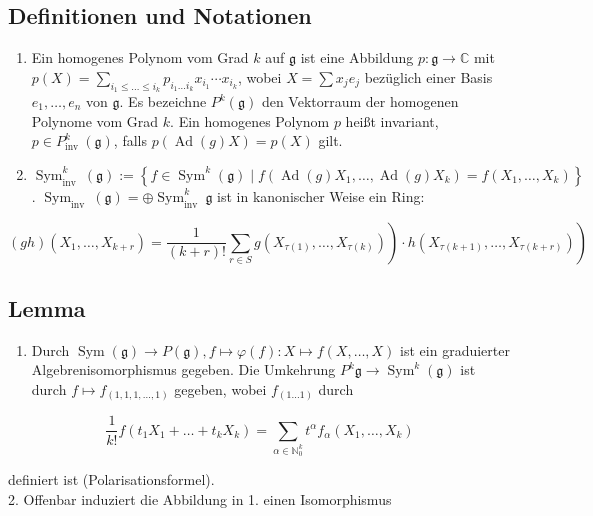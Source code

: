 \documentclass[10pt, letterpaper]{article}
\begin{document}
\subsection*{Definitionen und Notationen}
\begin{enumerate}
  \item Ein homogenes Polynom vom Grad $k$ auf $\mathfrak{g}$ ist eine Abbildung $p: \mathfrak{g} \rightarrow \mathbb{C}$ mit $p(X)=\sum_{i_{1} \leq \ldots \leq i_{k}} p_{i_{1} \ldots i_{k}} x_{i_{1}} \cdots x_{i_{k}}$, wobei $X=\sum x_{j} e_{j}$ bezüglich einer Basis $e_{1}, \ldots, e_{n}$ von $\mathfrak{g}$. Es bezeichne $P^{k}(\mathfrak{g})$ den Vektorraum der homogenen Polynome vom Grad $k$. Ein homogenes Polynom $p$ heißt invariant, $p \in P_{\text {inv }}^{k}(\mathfrak{g})$, falls $p(\operatorname{Ad}(g) X)=p(X)$ gilt.
  \item $\operatorname{Sym}_{\text {inv }}^{k}(\mathfrak{g}):=\left\{f \in \operatorname{Sym}^{k}(\mathfrak{g}) \mid f\left(\operatorname{Ad}(g) X_{1}, \ldots, \operatorname{Ad}(g) X_{k}\right)=f\left(X_{1}, \ldots, X_{k}\right)\right\}$. $\operatorname{Sym}_{\text {inv }}(\mathfrak{g})=\oplus \operatorname{Sym}_{\text {inv }}^{k} \mathfrak{g}$ ist in kanonischer Weise ein Ring:
\end{enumerate}

$$
\left.\left.(g h)\left(X_{1}, \ldots, X_{k+r}\right)=\frac{1}{(k+r)!} \sum_{r \in S} g\left(X_{\tau(1)}, \ldots, X_{\tau(k)}\right)\right) \cdot h\left(X_{\tau(k+1)}, \ldots, X_{\tau(k+r)}\right)\right)
$$

\subsection*{Lemma}
\begin{enumerate}
  \item Durch $\operatorname{Sym}(\mathfrak{g}) \rightarrow P(\mathfrak{g}), f \mapsto \varphi(f): X \mapsto f(X, \ldots, X)$ ist ein graduierter Algebrenisomorphismus gegeben. Die Umkehrung $P^{k} \mathfrak{g} \rightarrow \operatorname{Sym}^{k}(\mathfrak{g})$ ist durch $f \mapsto f_{(1,1,1, \ldots, 1)}$ gegeben, wobei $f_{(1 \ldots 1)}$ durch
\end{enumerate}

$$
\frac{1}{k!} f\left(t_{1} X_{1}+\ldots+t_{k} X_{k}\right)=\sum_{\alpha \in \mathbb{N}_{0}^{k}} t^{\alpha} f_{\alpha}\left(X_{1}, \ldots, X_{k}\right)
$$

definiert ist (Polarisationsformel).\\
2. Offenbar induziert die Abbildung in 1. einen Isomorphismus
\end{document}
